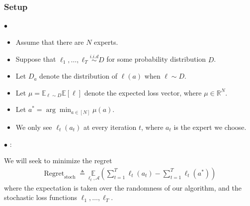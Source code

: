 \documentclass{article}
\begin{document}
\subsubsection{Setup}
$\bullet$ 
\begin{itemize}
    \item Assume that there are $N$ experts.
    \item Suppose that $\ell_{1}, \ldots, \ell_{T} \stackrel{i . i . d}{\sim} D$ for some probability distribution $D$.
    \item Let $D_{a}$ denote the distribution of $\ell(a)$ when $\ell \sim D$.
    \item Let $\mu=\mathbb{E}_{\ell \sim D} \mathbb{E}[\ell]$ denote the expected loss vector, where $\mu \in \mathbb{R}^{N}$.
    \item Let $a^{*}=\arg \min _{a \in[N]} \mu(a)$.
    \item We only see $\ell_{t}\left(a_{t}\right)$ at every iteration $t$, where $a_{t}$ is the expert we choose.
\end{itemize}
$\bullet$ :

We will seek to minimize the regret
\begin{align*}
\operatorname{Regret}_{\mathrm {stoch }} \triangleq \underset{\ell_{t}, \mathcal{A}}{\mathbb{E}}\left(\sum_{t=1}^{T} \ell_{t}\left(a_{t}\right)-\sum_{t=1}^{T} \ell_{t}\left(a^{*}\right)\right)
\end{align*}
where the expectation is taken over the randomness of our algorithm, and the stochastic loss functions $\ell_{1}, \ldots, \ell_{T}$.
\end{document}
